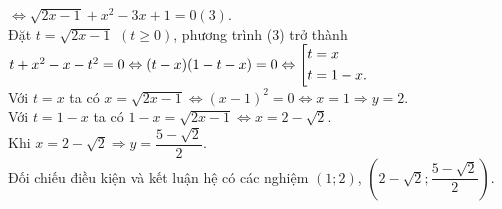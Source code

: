 \begin{ex}
{\begin{enumerate}[1)]
$\Leftrightarrow \sqrt{2x-1}+x^2-3x+1=0 (3)$.\\
Đặt $t=\sqrt{2x-1}$ $(t\ge 0)$, phương trình (3) trở thành\\
 $t+x^2-x-t^2=0 \Leftrightarrow (t-x)(1-t-x)=0 \Leftrightarrow \left[\begin{aligned}& t=x \\ & t=1-x. \end{aligned}\right.$\\
Với $t=x$ ta có $x=\sqrt{2x-1}\Leftrightarrow {(x-1)}^2=0\Leftrightarrow x=1\Rightarrow y=2.$\\
Với $t=1-x$ ta có $1-x=\sqrt{2x-1}\Leftrightarrow x=2-\sqrt{2}$.\\
Khi $x=2-\sqrt{2}\Rightarrow y=\dfrac{5-\sqrt{2}}{2}$.\\
Đối chiếu điều kiện và kết luận hệ có các nghiệm $(1; 2)$, $\left(2-\sqrt{2}; \dfrac{5-\sqrt{2}}{2}\right)$.
\end{enumerate}
}
\end{ex}

